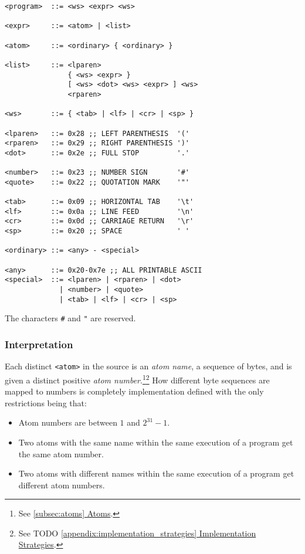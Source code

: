 \documentclass[twocolumn]{report}
\newcommand{\intralink}[2]{\hyperref[#1]{\ref*{#1} #2}}
\begin{document}
\begin{verbatim}
<program>  ::= <ws> <expr> <ws>

<expr>     ::= <atom> | <list>

<atom>     ::= <ordinary> { <ordinary> }

<list>     ::= <lparen>
               { <ws> <expr> }
               [ <ws> <dot> <ws> <expr> ] <ws>
               <rparen>

<ws>       ::= { <tab> | <lf> | <cr> | <sp> }

<lparen>   ::= 0x28 ;; LEFT PARENTHESIS  '('
<rparen>   ::= 0x29 ;; RIGHT PARENTHESIS ')'
<dot>      ::= 0x2e ;; FULL STOP         '.'

<number>   ::= 0x23 ;; NUMBER SIGN       '#'
<quote>    ::= 0x22 ;; QUOTATION MARK    '"'

<tab>      ::= 0x09 ;; HORIZONTAL TAB    '\t'
<lf>       ::= 0x0a ;; LINE FEED         '\n'
<cr>       ::= 0x0d ;; CARRIAGE RETURN   '\r'
<sp>       ::= 0x20 ;; SPACE             ' '

<ordinary> ::= <any> - <special>

<any>      ::= 0x20-0x7e ;; ALL PRINTABLE ASCII
<special>  ::= <lparen> | <rparen> | <dot>
             | <number> | <quote>
             | <tab> | <lf> | <cr> | <sp>
\end{verbatim}

The characters \texttt{#} and \texttt{"} are reserved.

\subsubsection{Interpretation}
\label{subsubsec:interpretation}

Each distinct \texttt{<atom>} in the source is an \emph{atom name}, a sequence of bytes, and is given a distinct positive \emph{atom number}.\footnote{See \intralink{subsec:atoms}{Atoms}.}\footnote{See TODO \intralink{appendix:implementation_strategies}{Implementation Strategies}.}
How different byte sequences are mapped to numbers is completely implementation defined with the only restrictions being that:

\begin{itemize}
\item Atom numbers are between $1$ and $2^{31} - 1$.
\item Two atoms with the same name within the same execution of a program get the same atom number.
\item Two atoms with different names within the same execution of a program get different atom numbers.
\end{itemize}
\end{document}
